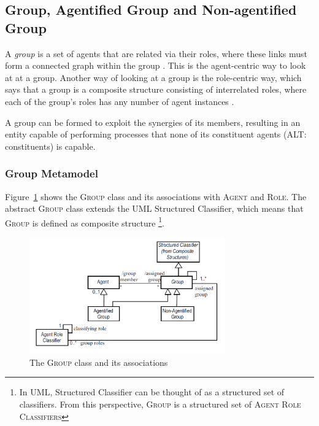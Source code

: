 \subsection{Group, Agentified Group and Non-agentified Group}

A \textit{group} is a set of agents that are related via their roles, where these links must form
a connected graph within the group \cite{Odell05}.
This is the agent-centric way to look at at a group.
Another way of looking at a group is the role-centric way, which says that a group is a composite structure consisting of interrelated roles, where each of the group's roles has any number of agent instances \cite{Odell05}.

A group can be formed to exploit the synergies of its members, resulting in an entity capable of performing processes that none of its constituent agents (ALT: constituents) is capable.

\subsubsection*{Group Metamodel}

Figure~\ref{figure:onp-group} shows the \textsc{Group} class and its associations with \textsc{Agent} and \textsc{Role}.
The abstract \textsc{Group} class extends the UML Structured Classifier, which means that \textsc{Group} is defined as composite structure \footnote{In UML, Structured Classifier can be thought of as a structured set of classifiers. From this perspective, \textsc{Group} is a structured set of \textsc{Agent Role Classifiers}}.

\begin{figure}[ht]
	\centering
	\includegraphics[width=0.75\textwidth]{images/onp-group.png}
	\caption{The \textsc{Group} class and its associations}
	\label{figure:onp-group}
\end{figure}

